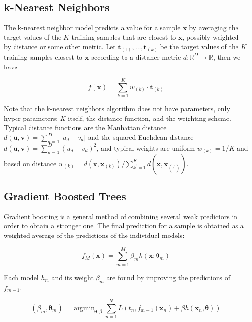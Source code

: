 \documentclass[12pt]{book}
\DeclareMathOperator*{\argmin}{argmin}
\begin{document}
\subsection{k-Nearest Neighbors}
The k-nearest neighbor model \cite{knn} predicts a value for a sample $\bm x$ by averaging the target values of the $K$ training samples that are closest to $\bm x$, possibly weighted by distance or some other metric. Let $\bm t_{(1)},\ldots,\bm t_{(k)}$ be the target values of the $K$ training samples closest to $\bm x$ according to a distance metric $d:\mathbb{R}^D\rightarrow\mathbb{R}$, then we have

\begin{equation}
f(\bm x)=\sum_{k=1}^K w_{(k)}\cdot\bm t_{(k)}
\end{equation}


Note that the k-nearest neighbors algorithm does not have parameters, only hyper\hyp{}parameters: $K$ itself, the distance function, and the weighting scheme. Typical distance functions are the Manhattan distance $d(\bm u,\bm v)=\sum_{d=1}^D\vert u_d-v_d\vert$ and the squared Euclidean distance $d(\bm u,\bm v)=\sum_{d=1}^D(u_d-v_d)^2$, and typical weights are uniform $w_{(k)}=1/K$ and based on distance $w_{(k)}=d(\bm x,\bm x_{(k)})/\sum_{k^\prime=1}^K d(\bm x,\bm x_{(k^\prime)})$.

\subsection{Gradient Boosted Trees}
Gradient boosting \citep{gradientboosting} is a general method of combining several weak predictors in order to obtain a stronger one. The final prediction for a sample is obtained as a weighted average of the predictions of the individual models:

\begin{equation}
\label{eq:gboost}
f_M(\bm x)=\sum_{m=1}^M \beta_m h(\bm x;\bm\theta_m)
\end{equation}

Each model $h_m$ and its weight $\beta_m$ are found by improving the predictions of $f_{m-1}$:

\begin{equation}
\label{eq:gboostjoint}
(\beta_m, \bm\theta_m)=\argmin_{\bm\theta,\beta}\sum_{n=1}^N L\left(
t_n, f_{m-1}(\bm x_n)+\beta h(\bm x_n,\bm\theta)
\right)
\end{equation}
\end{document}
